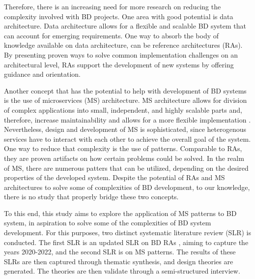 \documentclass{bmcart}
\begin{document}
Therefore, there is an increasing need for more research on reducing the complexity involved with BD projects. One area with good potential is data architecture. Data architecture allows for a flexible and scalable BD system that can account for emerging requirements. One way to absorb the body of knowledge available on data architecture, can be reference architectures (RAs). By presenting proven ways to solve common implementation challenges on an architectural level, RAs support the development of new systems by offering guidance and orientation.





% 


Another concept that has the potential to help with development of BD systems is the use of microservices (MS) architecture. MS architecture allows for division of complex applications into small, independent, and highly scalable parts and, therefore, increase maintainability and allows for a more flexible implementation \cite{Richardson.2022}. Nevertheless, design and development of MS is sophisticated, since heterogenous services have to interact with each other to achieve the overall goal of the system. One way to reduce that complexity is the use of patterns. Comparable to RAs, they are proven artifacts on how certain problems could be solved. In the realm of MS, there are numerous patters that can be utilized, depending on the desired properties of the developed system. Despite the potential of RAs and MS architectures to solve some of complexities of BD development, to our knowledge, there is no study that properly bridge these two concepts. 


To this end, this study aims to explore the application of MS patterns to BD system, in aspiration to solve some of the complexities of BD system development. For this purposes, two distinct systematic literature review (SLR) is conducted. The first SLR is an updated SLR on BD RAs \cite{Ataei.2020}, aiming to capture the years 2020-2022, and the second SLR is on MS patterns. The results of these SLRs are then captured through thematic synthesis, and design theories are generated. The theories are then validate through a semi-structured interview.
\end{document}
